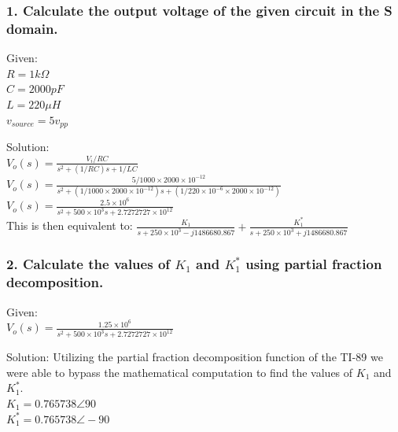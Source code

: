 \documentclass[11pt]{article}
\begin{document}
	\subsubsection*{1. Calculate the output voltage of the given circuit in the S domain.}
	\par{Given:}\\
	$R=1k\Omega$\\
	$C=2000 pF$\\
	$L=220\mu H$\\
	$v_{source}=5v_{pp}$
	\par{Solution:}\\
	$V_{o}(s)= \frac{V_{i}/RC}{s^{2}+(1/RC)s+1/LC}$\\
	$V_{o}(s)= \frac{5/1000\times2000\times 10^{-12}}{s^{2}+(1/1000\times2000\times 10^{-12})s+(1/220\times10^{-6}\times2000\times 10^{-12})}$\\
	$V_{o}(s)= \frac{2.5\times10^{6}}{s^{2}+500\times10^{3}s+2.7272727\times10^{12}}$\\
	This is then equivalent to:
	$\frac{K_{1}}{s+250\times 10^{3}-j1486680.867}+\frac{K^{*}_{1}}{s+250\times 10^{3}+j1486680.867}$
	\subsubsection*{2. Calculate the values of $K_{1}$ and $K^{*}_{1}$ using partial fraction decomposition.}
	\par{Given:}\\
	$V_{o}(s)= \frac{1.25\times10^{6}}{s^{2}+500\times10^{3}s+2.7272727\times10^{12}}$\\
	\par{Solution:}
	Utilizing the partial fraction decomposition function of the TI-89 we were able to bypass the mathematical computation to find the values of $K_{1}$ and $K^{*}_{1}$.\\
	$K_{1}=0.765738\angle90$\\
	$K^{*}_{1}=0.765738\angle-90$
\end{document}
